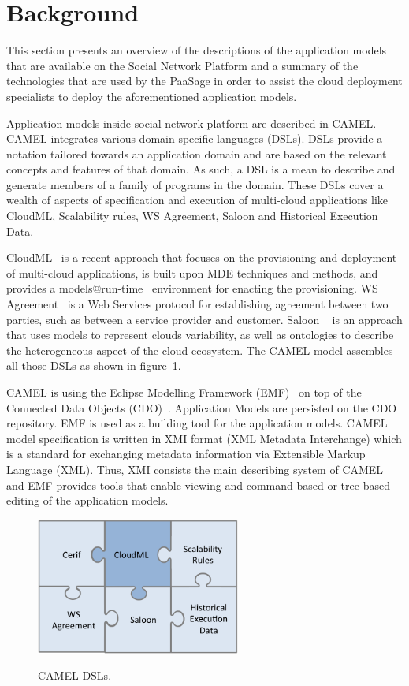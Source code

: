 \section{Background}
\label{sec:background}
This section presents an overview of the descriptions of the application models that are available on the Social Network Platform and a summary of the technologies that are used by the PaaSage in order to assist the cloud deployment specialists to deploy the aforementioned application models.

Application models inside social network platform are described in CAMEL. CAMEL integrates various domain-specific languages (DSLs).
DSLs provide a notation tailored towards an application domain and are based on the relevant concepts and features of that domain. As such, a DSL is a mean to describe and generate members of a family of programs in the domain. 
These DSLs cover a wealth of aspects of specification and execution of multi-cloud applications like CloudML, Scalability rules, WS Agreement, Saloon and Historical Execution Data. 

CloudML~\cite{FerryRossiniCMS13} is a recent approach that focuses on the provisioning and deployment of multi-cloud applications, is built upon MDE techniques and methods, and provides a models@run-time~\cite{models-runtime} environment for enacting the provisioning.  WS Agreement~\cite{andrieux2007web} is a Web Services protocol for establishing agreement between two parties, such as between a service provider and customer. Saloon ~\cite{quinton2013towards} is an approach that uses models to represent clouds variability, as well as ontologies to describe the heterogeneous aspect of the cloud ecosystem. The CAMEL model assembles all those DSLs as shown in figure~\ref{fig:dsls}.

CAMEL is using the Eclipse Modelling Framework (EMF)~\cite{steinberg2008emf} on top of the Connected Data Objects (CDO)~\cite{cdomodel}. Application Models are persisted on the CDO repository. EMF is used as a building tool for the application models. CAMEL model specification is written in XMI format (XML Metadata Interchange) which is a standard for exchanging metadata information via Extensible Markup Language (XML). Thus, XMI consists the main describing system of CAMEL and EMF provides tools that enable viewing and command-based or tree-based editing of the application models. 

\begin{figure}[h]
	\caption{CAMEL DSLs.}
	\includegraphics[width=0.6\textwidth,natwidth=200,natheight=150]{./fig/dsl.png}
	\centering
	\label{fig:dsls}
\end{figure}

